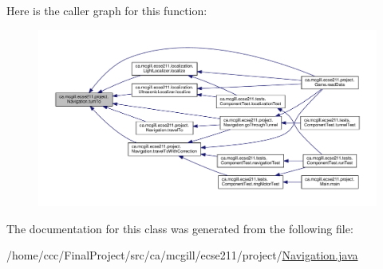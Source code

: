 Here is the caller graph for this function\+:
\nopagebreak
\begin{figure}[H]
\begin{center}
\leavevmode
\includegraphics[width=350pt]{classca_1_1mcgill_1_1ecse211_1_1project_1_1_navigation_a3bbe0645f2b3b3d0986b4a707fb5a00c_icgraph}
\end{center}
\end{figure}


The documentation for this class was generated from the following file\+:\begin{DoxyCompactItemize}
\item 
/home/ccc/\+Final\+Project/src/ca/mcgill/ecse211/project/\hyperlink{_navigation_8java}{Navigation.\+java}\end{DoxyCompactItemize}
